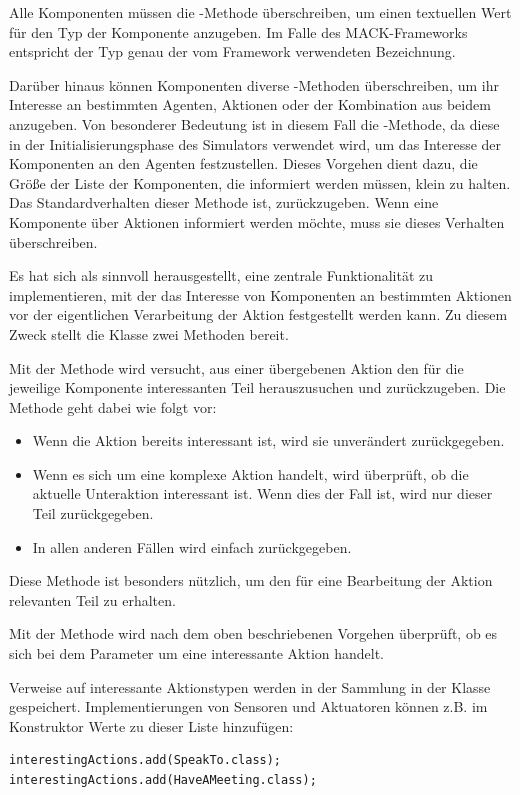 Alle Komponenten müssen die -Methode überschreiben, um einen textuellen Wert für den Typ der Komponente anzugeben. Im Falle des MACK-Frameworks entspricht der Typ genau der vom Framework verwendeten Bezeichnung.

Darüber hinaus können Komponenten diverse -Methoden überschreiben, um ihr Interesse an bestimmten Agenten, Aktionen oder der Kombination aus beidem anzugeben. Von besonderer Bedeutung ist in diesem Fall die -Methode, da diese in der Initialisierungsphase des Simulators verwendet wird, um das Interesse der Komponenten an den Agenten festzustellen. Dieses Vorgehen dient dazu, die Größe der Liste der Komponenten, die informiert werden müssen, klein zu halten. Das Standardverhalten dieser Methode ist,  zurückzugeben. Wenn eine Komponente über Aktionen informiert werden möchte, muss sie dieses Verhalten überschreiben.

Es hat sich als sinnvoll herausgestellt, eine zentrale Funktionalität zu implementieren, mit der das Interesse von Komponenten an bestimmten Aktionen vor der eigentlichen Verarbeitung der Aktion festgestellt werden kann. Zu diesem Zweck stellt die Klasse  zwei Methoden bereit. 

Mit der Methode  wird versucht, aus einer übergebenen Aktion den für die jeweilige Komponente interessanten Teil herauszusuchen und zurückzugeben. Die Methode geht dabei wie folgt vor:
\begin{itemize}
	\item Wenn die Aktion bereits interessant ist, wird sie unverändert zurückgegeben.
	\item Wenn es sich um eine komplexe Aktion handelt, wird überprüft, ob die aktuelle Unteraktion interessant ist. Wenn dies der Fall ist, wird nur dieser Teil zurückgegeben.
	\item In allen anderen Fällen wird einfach  zurückgegeben.
\end{itemize}
Diese Methode ist besonders nützlich, um den für eine Bearbeitung der Aktion relevanten Teil zu erhalten.

Mit der Methode  wird nach dem oben beschriebenen Vorgehen überprüft, ob es sich bei dem Parameter um eine interessante Aktion handelt.

Verweise auf interessante Aktionstypen werden in der Sammlung  in der Klasse  gespeichert. Implementierungen von Sensoren und Aktuatoren können z.B. im Konstruktor Werte zu dieser Liste hinzufügen:
\begin{illfloat}[H]
\begin{lstlisting}
interestingActions.add(SpeakTo.class);
interestingActions.add(HaveAMeeting.class);
\end{lstlisting}
\label{src:interaction_components_addInterestingActions}
\end{illfloat}

